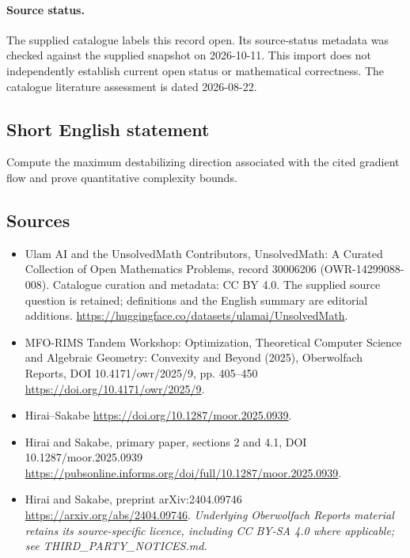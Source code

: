 \documentclass[11pt]{article}
\begin{document}
\paragraph{Source status.}
The supplied catalogue labels this record open. Its source-status metadata was checked against the supplied snapshot on 2026-10-11. This import does not independently establish current open status or mathematical correctness. The catalogue literature assessment is dated 2026-08-22.
\subsection{Short English statement}
Compute the maximum destabilizing direction associated with the cited gradient flow and prove quantitative complexity bounds.
\subsection{Sources}
\begin{itemize}
\item[\hypertarget{source:30006206:1}{S1}] Ulam AI and the UnsolvedMath Contributors, UnsolvedMath: A Curated Collection of Open Mathematics Problems, record 30006206 (OWR-14299088-008). Catalogue curation and metadata: CC BY 4.0. The supplied source question is retained; definitions and the English summary are editorial additions.
\url{https://huggingface.co/datasets/ulamai/UnsolvedMath}.
\item[\hypertarget{source:30006206:2}{S2}] MFO-RIMS Tandem Workshop: Optimization, Theoretical Computer Science and Algebraic Geometry: Convexity and Beyond (2025), Oberwolfach Reports, DOI 10.4171/owr/2025/9, pp. 405--450
\url{https://doi.org/10.4171/owr/2025/9}.
\item[\hypertarget{source:30006206:3}{S3}] Hirai--Sakabe
\url{https://doi.org/10.1287/moor.2025.0939}.
\item[\hypertarget{source:30006206:4}{S4}] Hirai and Sakabe, primary paper, sections 2 and 4.1, DOI 10.1287/moor.2025.0939
\url{https://pubsonline.informs.org/doi/full/10.1287/moor.2025.0939}.
\item[\hypertarget{source:30006206:5}{S5}] Hirai and Sakabe, preprint arXiv:2404.09746
\url{https://arxiv.org/abs/2404.09746}.
\textit{Underlying Oberwolfach Reports material retains its source-specific licence, including CC BY-SA 4.0 where applicable; see THIRD\_PARTY\_NOTICES.md.}
\end{itemize}
\end{document}
